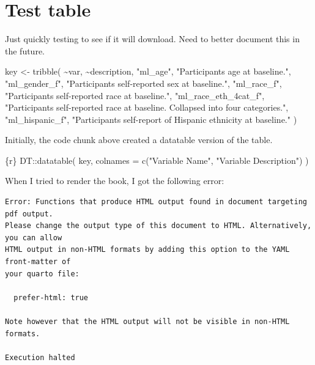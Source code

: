 \documentclass[
  letterpaper,
  DIV=11,
  numbers=noendperiod]{scrreprt}
\newenvironment{Shaded}{\begin{snugshade}}{\end{snugshade}}
\newcommand{\FunctionTok}[1]{\textcolor[rgb]{0.28,0.35,0.67}{#1}}
\newcommand{\InformationTok}[1]{\textcolor[rgb]{0.37,0.37,0.37}{#1}}
\newcommand{\NormalTok}[1]{\textcolor[rgb]{0.00,0.23,0.31}{#1}}
\newcommand{\OtherTok}[1]{\textcolor[rgb]{0.00,0.23,0.31}{#1}}
\newcommand{\SpecialCharTok}[1]{\textcolor[rgb]{0.37,0.37,0.37}{#1}}
\newcommand{\StringTok}[1]{\textcolor[rgb]{0.13,0.47,0.30}{#1}}
\begin{document}
\section{Test table}\label{test-table}

Just quickly testing to see if it will download. Need to better document
this in the future.

\begin{Shaded}
\begin{Highlighting}[]
\NormalTok{key }\OtherTok{\textless{}{-}} \FunctionTok{tribble}\NormalTok{(}
 \SpecialCharTok{\textasciitilde{}}\NormalTok{var, }\SpecialCharTok{\textasciitilde{}}\NormalTok{description,}
 \StringTok{"ml\_age"}\NormalTok{, }\StringTok{"Participant\textquotesingle{}s age at baseline."}\NormalTok{,}
 \StringTok{"ml\_gender\_f"}\NormalTok{, }\StringTok{"Participant\textquotesingle{}s self{-}reported sex at baseline."}\NormalTok{,}
 \StringTok{"ml\_race\_f"}\NormalTok{, }\StringTok{"Participant\textquotesingle{}s self{-}reported race at baseline."}\NormalTok{,}
 \StringTok{"ml\_race\_eth\_4cat\_f"}\NormalTok{, }\StringTok{"Participant\textquotesingle{}s self{-}reported race at baseline. Collapsed into four categories."}\NormalTok{,}
 \StringTok{"ml\_hispanic\_f"}\NormalTok{, }\StringTok{"Participant\textquotesingle{}s self{-}report of Hispanic ethnicity at baseline."}
\NormalTok{)}
\end{Highlighting}
\end{Shaded}

Initially, the code chunk above created a datatable version of the
table.

\begin{Shaded}
\begin{Highlighting}[]
\InformationTok{\textasciigrave{}\textasciigrave{}\textasciigrave{}\{r\}}
\InformationTok{DT::datatable(}
\InformationTok{  key,}
\InformationTok{  colnames = c("Variable Name", "Variable Description")}
\InformationTok{)}
\InformationTok{\textasciigrave{}\textasciigrave{}\textasciigrave{}}
\end{Highlighting}
\end{Shaded}

When I tried to render the book, I got the following error:

\begin{verbatim}
Error: Functions that produce HTML output found in document targeting pdf output.
Please change the output type of this document to HTML. Alternatively, you can allow
HTML output in non-HTML formats by adding this option to the YAML front-matter of
your quarto file:

  prefer-html: true

Note however that the HTML output will not be visible in non-HTML formats.

Execution halted
\end{verbatim}
\end{document}
